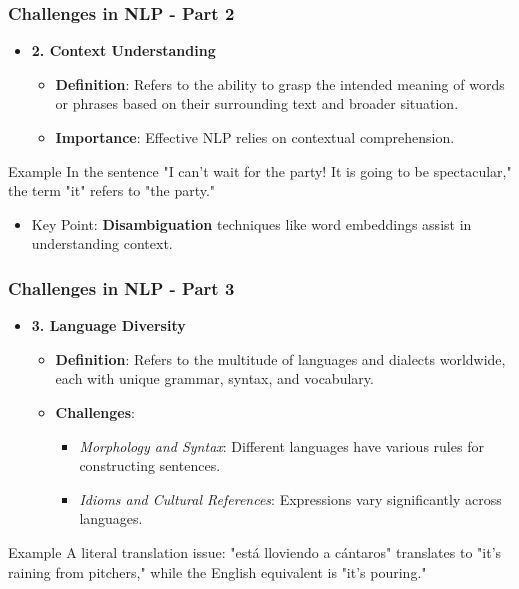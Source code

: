 \documentclass{beamer}
\begin{document}
\begin{frame}[fragile]
    \frametitle{Challenges in NLP - Part 2}
    \begin{itemize}
        \item \textbf{2. Context Understanding}
        \begin{itemize}
            \item \textbf{Definition}: Refers to the ability to grasp the intended meaning of words or phrases based on their surrounding text and broader situation.
            \item \textbf{Importance}: Effective NLP relies on contextual comprehension.
        \end{itemize}
    \end{itemize}
    \begin{block}{Example}
        In the sentence "I can't wait for the party! It is going to be spectacular," the term "it" refers to "the party."
    \end{block}
    \begin{itemize}
        \item Key Point: \textbf{Disambiguation} techniques like word embeddings assist in understanding context.
    \end{itemize}
\end{frame}

\begin{frame}[fragile]
    \frametitle{Challenges in NLP - Part 3}
    \begin{itemize}
        \item \textbf{3. Language Diversity}
        \begin{itemize}
            \item \textbf{Definition}: Refers to the multitude of languages and dialects worldwide, each with unique grammar, syntax, and vocabulary.
            \item \textbf{Challenges}:
            \begin{itemize}
                \item \textit{Morphology and Syntax}: Different languages have various rules for constructing sentences.
                \item \textit{Idioms and Cultural References}: Expressions vary significantly across languages.
            \end{itemize}
        \end{itemize}
    \end{itemize}
    \begin{block}{Example}
        A literal translation issue: "está lloviendo a cántaros" translates to "it's raining from pitchers," while the English equivalent is "it's pouring."
    \end{block}
\end{frame}
\end{document}
